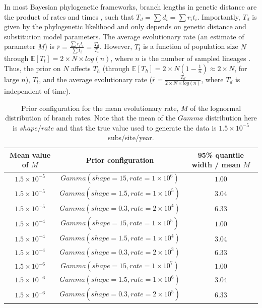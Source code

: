\documentclass[11pt]{article}
\begin{document}
In most Bayesian phylogenetic frameworks, branch lengths in genetic distance are the product of rates and times \citep{drummond2006relaxed, douglas2021adaptive, hohna2016revbayes}, such that $T_d=\sum d_i =\sum r_i t_i$. Importantly, $T_d$ is given by the phylogenetic likelihood and only depends on genetic distance and substitution model parameters. The average evolutionary rate (an estimate of parameter $M$) is $\bar{r}=\frac{\sum r_i t_i}{\sum t_i}=\frac{T_d}{T_t}$. However, $T_t$ is a function of population size $N$ through $\mathbb{E}[T_t]=2\times N\times log(n)$, where $n$ is the number of sampled lineages \citep{arbisser2018joint, tavare1997inferring}. Thus, the prior on $N$ affects $T_h$ (through $\mathbb{E}[T_h]=2\times N (1-\frac{1}{n})\approx 2 \times N$, for large $n$), $T_t$, and the average evolutionary rate ($\bar{r}=\frac{T_d}{2\times N\times log(n)}$, where $T_d$ is independent of time). 



\begin{table}[H]
	\caption{Prior configuration for the mean evolutionary rate, $M$ of the lognormal distribution of branch rates. Note that the mean of the $Gamma$ distribution here is $shape/rate$ and that the true value used to generate the data is $1.5\times10^{-5}$ subs/site/year.} 
	\begin{center} 
		\label{table:prior_distros}
		\begin{tabular}{ c|c|c }
			Mean value of $M$ & Prior configuration & 95\% quantile width / mean $M$\\
			\hline
			$1.5\times10^{-5}$ & $Gamma(shape=15, rate=1\times10^6)$ & $1.00$\\
            $1.5\times10^{-5}$ & $Gamma(shape=1.5, rate=1\times10^5)$ & $3.04$\\
			$1.5\times10^{-5}$ & $Gamma(shape=0.3, rate=2\times10^4)$ & $6.33$\\

            $1.5\times10^{-4}$ & $Gamma(shape=15, rate=1\times10^{5})$ & $1.00$\\
			$1.5\times10^{-4}$ & $Gamma(shape=1.5, rate=1\times10^4)$ & $3.04$\\
			$1.5\times10^{-4}$ & $Gamma(shape=0.3, rate=2\times10^{3})$ & $6.33$\\
			
			$1.5\times10^{-6}$ & $Gamma(shape=15, rate=1\times10^7)$ & $1.00$\\
            $1.5\times10^{-6}$ & $Gamma(shape=1.5, rate=1\times10^6)$ & $3.04$\\
			$1.5\times10^{-6}$ & $Gamma(shape=0.3, rate=2\times10^5)$ & $6.33$\\
		\end{tabular}
	\end{center}	%
\end{table}
\end{document}
